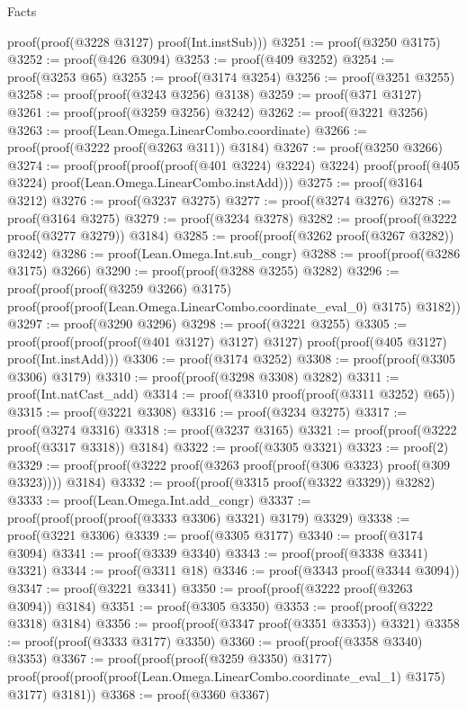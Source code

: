 \begin{lexlean}{Facts}
\begin{coremodule}
      proof(proof(@3228 @3127) proof(Int.instSub)))
@3251 := proof(@3250 @3175)
@3252 := proof(@426 @3094)
@3253 := proof(@409 @3252)
@3254 := proof(@3253 @65)
@3255 := proof(@3174 @3254)
@3256 := proof(@3251 @3255)
@3258 := proof(proof(@3243 @3256) @3138)
@3259 := proof(@371 @3127)
@3261 := proof(proof(@3259 @3256) @3242)
@3262 := proof(@3221 @3256)
@3263 := proof(Lean.Omega.LinearCombo.coordinate)
@3266 := proof(proof(@3222 proof(@3263 @311)) @3184)
@3267 := proof(@3250 @3266)
@3274 := proof(proof(proof(proof(@401 @3224) @3224) @3224)
      proof(proof(@405 @3224) proof(Lean.Omega.LinearCombo.instAdd)))
@3275 := proof(@3164 @3212)
@3276 := proof(@3237 @3275)
@3277 := proof(@3274 @3276)
@3278 := proof(@3164 @3275)
@3279 := proof(@3234 @3278)
@3282 := proof(proof(@3222 proof(@3277 @3279)) @3184)
@3285 := proof(proof(@3262 proof(@3267 @3282)) @3242)
@3286 := proof(Lean.Omega.Int.sub_congr)
@3288 := proof(proof(@3286 @3175) @3266)
@3290 := proof(proof(@3288 @3255) @3282)
@3296 := proof(proof(proof(@3259 @3266) @3175)
      proof(proof(proof(Lean.Omega.LinearCombo.coordinate_eval_0) @3175) @3182))
@3297 := proof(@3290 @3296)
@3298 := proof(@3221 @3255)
@3305 := proof(proof(proof(proof(@401 @3127) @3127) @3127)
      proof(proof(@405 @3127) proof(Int.instAdd)))
@3306 := proof(@3174 @3252)
@3308 := proof(proof(@3305 @3306) @3179)
@3310 := proof(proof(@3298 @3308) @3282)
@3311 := proof(Int.natCast_add)
@3314 := proof(@3310 proof(proof(@3311 @3252) @65))
@3315 := proof(@3221 @3308)
@3316 := proof(@3234 @3275)
@3317 := proof(@3274 @3316)
@3318 := proof(@3237 @3165)
@3321 := proof(proof(@3222 proof(@3317 @3318)) @3184)
@3322 := proof(@3305 @3321)
@3323 := proof(2)
@3329 := proof(proof(@3222 proof(@3263 proof(proof(@306 @3323) proof(@309 @3323)))) @3184)
@3332 := proof(proof(@3315 proof(@3322 @3329)) @3282)
@3333 := proof(Lean.Omega.Int.add_congr)
@3337 := proof(proof(proof(proof(@3333 @3306) @3321) @3179) @3329)
@3338 := proof(@3221 @3306)
@3339 := proof(@3305 @3177)
@3340 := proof(@3174 @3094)
@3341 := proof(@3339 @3340)
@3343 := proof(proof(@3338 @3341) @3321)
@3344 := proof(@3311 @18)
@3346 := proof(@3343 proof(@3344 @3094))
@3347 := proof(@3221 @3341)
@3350 := proof(proof(@3222 proof(@3263 @3094)) @3184)
@3351 := proof(@3305 @3350)
@3353 := proof(proof(@3222 @3318) @3184)
@3356 := proof(proof(@3347 proof(@3351 @3353)) @3321)
@3358 := proof(proof(@3333 @3177) @3350)
@3360 := proof(proof(@3358 @3340) @3353)
@3367 := proof(proof(proof(@3259 @3350) @3177)
      proof(proof(proof(proof(Lean.Omega.LinearCombo.coordinate_eval_1) @3175) @3177) @3181))
@3368 := proof(@3360 @3367)

\end{coremodule}
\end{lexlean}
